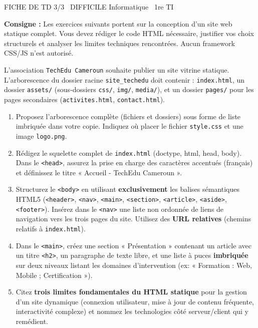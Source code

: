 \documentclass[11pt]{article}
\begin{document}
\begin{tcolorbox}[enhanced,colback=popink,colframe=popink,arc=10pt,boxrule=0pt,left=12pt,right=12pt,top=9pt,bottom=9pt]
{\color{white}\popxbold\small FICHE DE TD 3/3 \textbullet\ DIFFICILE \hfill Informatique \textbullet\ 1re TI\par}
\end{tcolorbox}
\vspace{4pt}
\noindent \textbf{Consigne :} Les exercices suivants portent sur la conception d'un site web statique complet. Vous devez rédiger le code HTML nécessaire, justifier vos choix structurels et analyser les limites techniques rencontrées. Aucun framework CSS/JS n'est autorisé.

\begin{exercice}
L'association \texttt{TechEdu Cameroun} souhaite publier un site vitrine statique. L'arborescence du dossier racine \texttt{site\_techedu} doit contenir : \texttt{index.html}, un dossier \texttt{assets/} (sous-dossiers \texttt{css/}, \texttt{img/}, \texttt{media/}), et un dossier \texttt{pages/} pour les pages secondaires (\texttt{activites.html}, \texttt{contact.html}).
\begin{enumerate}
    \item Proposez l'arborescence complète (fichiers et dossiers) sous forme de liste imbriquée dans votre copie. Indiquez où placer le fichier \texttt{style.css} et une image \texttt{logo.png}.
    \item Rédigez le squelette complet de \texttt{index.html} (doctype, html, head, body). Dans le \texttt{<head>}, assurez la prise en charge des caractères accentués (français) et définissez le titre « Accueil - TechEdu Cameroun ».
    \item Structurez le \texttt{<body>} en utilisant \textbf{exclusivement} les balises sémantiques HTML5 (\texttt{<header>}, \texttt{<nav>}, \texttt{<main>}, \texttt{<section>}, \texttt{<article>}, \texttt{<aside>}, \texttt{<footer>}). Insérez dans le \texttt{<nav>} une liste non ordonnée de liens de navigation vers les trois pages du site. Utilisez des \textbf{URL relatives} (chemins relatifs à \texttt{index.html}).
    \item Dans le \texttt{<main>}, créez une section « Présentation » contenant un article avec un titre \texttt{<h2>}, un paragraphe de texte libre, et une liste à puces \textbf{imbriquée} sur deux niveaux listant les domaines d'intervention (ex: « Formation : Web, Mobile ; Certification »).
    \item Citez \textbf{trois limites fondamentales du HTML statique} pour la gestion d'un site dynamique (connexion utilisateur, mise à jour de contenu fréquente, interactivité complexe) et nommez les technologies côté serveur/client qui y remédient.
\end{enumerate}
\end{exercice}
\end{document}

